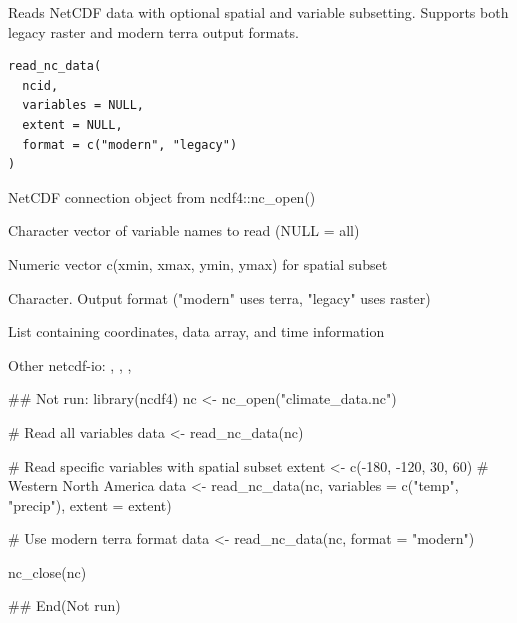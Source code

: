 \documentclass[a4paper]{book}
\begin{document}
%
\begin{Description}\relax
Reads NetCDF data with optional spatial and variable subsetting.
Supports both legacy raster and modern terra output formats.
\end{Description}
%
\begin{Usage}
\begin{verbatim}
read_nc_data(
  ncid,
  variables = NULL,
  extent = NULL,
  format = c("modern", "legacy")
)
\end{verbatim}
\end{Usage}
%
\begin{Arguments}
\begin{ldescription}
\item[\code{ncid}] NetCDF connection object from ncdf4::nc\_open()

\item[\code{variables}] Character vector of variable names to read (NULL = all)

\item[\code{extent}] Numeric vector c(xmin, xmax, ymin, ymax) for spatial subset

\item[\code{format}] Character. Output format ("modern" uses terra, "legacy" uses raster)
\end{ldescription}
\end{Arguments}
%
\begin{Value}
List containing coordinates, data array, and time information
\end{Value}
%
\begin{SeeAlso}\relax
Other netcdf-io: 
,
,
,
\end{SeeAlso}
%
\begin{Examples}
\begin{ExampleCode}
## Not run: 
library(ncdf4)
nc <- nc_open("climate_data.nc")

# Read all variables
data <- read_nc_data(nc)

# Read specific variables with spatial subset
extent <- c(-180, -120, 30, 60)  # Western North America
data <- read_nc_data(nc, variables = c("temp", "precip"), extent = extent)

# Use modern terra format
data <- read_nc_data(nc, format = "modern")

nc_close(nc)

## End(Not run)
\end{ExampleCode}
\end{Examples}
\end{document}
